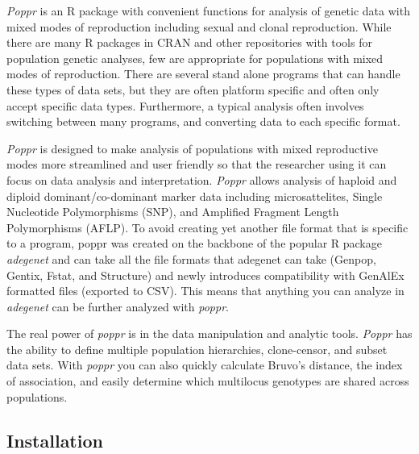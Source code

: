 \documentclass[letterpaper]{article}
\newcommand{\tab}{\hspace*{1em}}
\begin{document}
\tab\tab\textit{Poppr} is an R package with convenient functions for analysis of genetic data with mixed modes of reproduction including sexual and clonal reproduction. While there are many R packages in CRAN and other repositories with tools for population genetic analyses, few are appropriate for populations with mixed modes of reproduction. There are several stand alone programs that can handle these types of data sets, but they are often platform specific and often only accept specific data types. Furthermore, a typical analysis often involves switching between many programs, and converting data to each specific format.

\textit{Poppr} is designed to make analysis of populations with mixed reproductive modes more streamlined and user friendly so that the researcher using it can focus on data analysis and interpretation. \textit{Poppr} allows analysis of haploid and diploid dominant/co-dominant marker data including microsattelites, Single Nucleotide Polymorphisms (SNP), and Amplified Fragment Length Polymorphisms (AFLP). To avoid creating yet another file format that is specific to a program, poppr was created on the backbone of the popular R package \textit{adegenet} and can take all the file formats that adegenet can take (Genpop, Gentix, Fstat, and Structure) and newly introduces compatibility with GenAlEx formatted files (exported to CSV). This means that anything you can analyze in \textit{adegenet} can be further analyzed with \textit{poppr}.

The real power of \textit{poppr} is in the data manipulation and analytic tools. \textit{Poppr} has the ability to define multiple population hierarchies, clone-censor, and subset data sets. With \textit{poppr} you can also quickly calculate Bruvo's distance, the index of association, and easily determine which multilocus genotypes are shared across populations.
\subsection{Installation}
\end{document}
